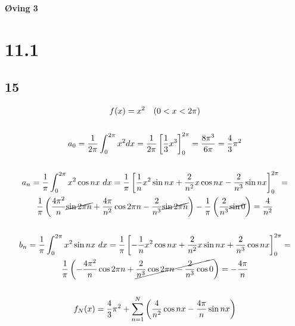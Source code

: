 \begin{center}
	\LARGE{\textbf{Øving 3}}
\end{center}


\section*{11.1}


\subsection*{15}


\begin{gather*}
	f(x) = x^2 \quad
	(0 < x < 2 \pi)
	\\ \\
	a_0 = \frac{1}{2 \pi} \int_0^{2 \pi}{x^2 d x} =
	\frac{1}{2 \pi} \left[\frac{1}{3} x^3\right]_0^{2\pi} =
	\frac{8 \pi^3}{6 \pi} =
	\frac{4}{3} \pi^2
	\\ \\
	a_n = \frac{1}{\pi} \int_0^{2 \pi}{x^2 \cos{n x}\ dx} =
	\frac{1}{\pi} \left[
		\frac{1}{n} x^2 \sin{n x} +
		\frac{2}{n^2} x \cos{n x} -
		\frac{2}{n^3} \sin{n x}
	\right]_0^{2 \pi} =
	\\
	\frac{1}{\pi} \left(
		\frac{4 \pi^2}{n} \cancel{\sin{2 \pi n}} +
		\frac{4 \pi}{n^2} \cos{2 \pi n} -
		\frac{2}{n^3} \cancel{\sin{2 \pi n}}
	\right) -
	\frac{1}{\pi} \left(
		\frac{2}{n^3} \cancel{\sin{0}}
	\right) =
	\frac{4}{n^2}
	\\
	\\
	b_n = \frac{1}{\pi} \int_0^{2 \pi}{x^2 \sin{n x}\ d x} =
	\frac{1}{\pi} \left[
		-\frac{1}{n} x^2 \cos{n x} +
		\frac{2}{n^2} x \sin{n x} +
		\frac{2}{n^3} \cos{n x}
	\right]_0^{2 \pi} =
	\\
	\frac{1}{\pi} \left(
		-\frac{4 \pi^2}{n} \cos{2 \pi n} +
		\cancel{
			\frac{2}{n^3} \cos{2 \pi n} -
			\frac{2}{n^3} \cos{0}
		}
	\right) =
	-\frac{4 \pi}{n}
	\\ \\
	f_N(x) = \frac{4}{3} \pi^2 +
	\sum_{n = 1}^N{\left(
		\frac{4}{n^2} \cos{n x} - \frac{4 \pi}{n} \sin{n x}
	\right)}
\end{gather*}

\bigskip

\bigskip
\\


\newpage


